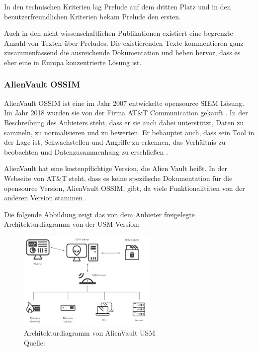 In den technischen Kriterien lag Prelude auf dem dritten Platz und in den benutzerfreundlichen Kriterien bekam Prelude den ersten. 

Auch in den nicht wissenschaftlichen Publikationen existiert eine begrenzte Anzahl von Texten über Preludes. Die existierenden Texte kommentieren ganz zusammenfassend die ausreichende Dokumentation und heben hervor, dass es eher eine in Europa konzentrierte Lösung ist.

\subsubsection{AlienVault OSSIM}
AlienVault OSSIM ist eine im Jahr 2007 entwickelte \gls{opensource} \gls{SIEM} Lösung. Im Jahr 2018 wurden sie von der Firma AT\&T Communication gekauft  \citep{CBN_AV}. In der Beschreibung des Anbieters steht, dass er sie auch dabei unterstützt, Daten zu sammeln, zu normalisieren und zu bewerten. Er behauptet auch, dass sein Tool in der Lage ist, Schwachstellen und Angriffe zu erkennen, das Verhältnis zu beobachten und Datenzusammenhang zu erschließen \citep{ATT_AVO}. 

AlienVault hat eine kostenpflichtige Version, die Alien Vault  heißt. In der Webseite von AT\&T steht, dass es keine spezifische Dokumentation für die \gls{opensource} Version, AlienVault OSSIM, gibt, da viele Funktionalitäten von der anderen Version stammen \citep{ATT_AVO}. 

\newpage
Die folgende Abbildung zeigt das von dem Anbieter freigelegte Architekturdiagramm von der \gls{USM} Version:

\begin{figure}[H]
   \centering
   \includegraphics[width=0.6\textwidth]{assets/2_p6.png}
   \caption[Architekturdiagramm von AlienVault \gls{USM}]
   {Architekturdiagramm von AlienVault \gls{USM} \\Quelle: \citep{ATT_AVO} }
   \centering
\end{figure}

